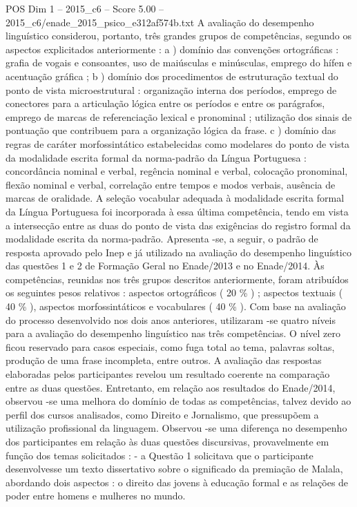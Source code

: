 \begin{textsample}{POS Dim 1 – 2015\_c6 – Score 5.00 – 2015\_c6/enade\_2015\_psico\_e312af574b.txt}
A avaliação do desempenho linguístico considerou, portanto, três grandes grupos de competências, segundo os aspectos explicitados anteriormente : a ) domínio das convenções ortográficas : grafia de vogais e consoantes, uso de maiúsculas e minúsculas, emprego do hífen e acentuação gráfica ; b ) domínio dos procedimentos de estruturação textual do ponto de vista microestrutural : organização interna dos períodos, emprego de conectores para a articulação lógica entre os períodos e entre os parágrafos, emprego de marcas de referenciação lexical e pronominal ; utilização dos sinais de pontuação que contribuem para a organização lógica da frase. c ) domínio das regras de caráter morfossintático estabelecidas como modelares do ponto de vista da modalidade escrita formal da norma-padrão da Língua Portuguesa : concordância nominal e verbal, regência nominal e verbal, colocação pronominal, flexão nominal e verbal, correlação entre tempos e modos verbais, ausência de marcas de oralidade.
A seleção vocabular adequada à modalidade escrita formal da Língua Portuguesa foi incorporada à essa última competência, tendo em vista a intersecção entre as duas do ponto de vista das exigências do registro formal da modalidade escrita da norma-padrão.
Apresenta -se, a seguir, o padrão de resposta aprovado pelo Inep e já utilizado na avaliação do desempenho linguístico das questões 1 e 2 de Formação Geral no Enade/2013 e no Enade/2014.
Às competências, reunidas nos três grupos descritos anteriormente, foram atribuídos os seguintes pesos relativos : aspectos ortográficos ( 20 \% ) ; aspectos textuais ( 40 \% ), aspectos morfossintáticos e vocabulares ( 40 \% ).
Com base na avaliação do processo desenvolvido nos dois anos anteriores, utilizaram -se quatro níveis para a avaliação do desempenho linguístico nas três competências.
O nível zero ficou reservado para casos especiais, como fuga total ao tema, palavras soltas, produção de uma frase incompleta, entre outros.
A avaliação das respostas elaboradas pelos participantes revelou um resultado coerente na comparação entre as duas questões.
Entretanto, em relação aos resultados do Enade/2014, observou -se uma melhora do domínio de todas as competências, talvez devido ao perfil dos cursos analisados, como Direito e Jornalismo, que pressupõem a utilização profissional da linguagem.
Observou -se uma diferença no desempenho dos participantes em relação às duas questões discursivas, provavelmente em função dos temas solicitados : - a Questão 1 solicitava que o participante desenvolvesse um texto dissertativo sobre o significado da premiação de Malala, abordando dois aspectos : o direito das jovens à educação formal e as relações de poder entre homens e mulheres no mundo.

\end{textsample}
